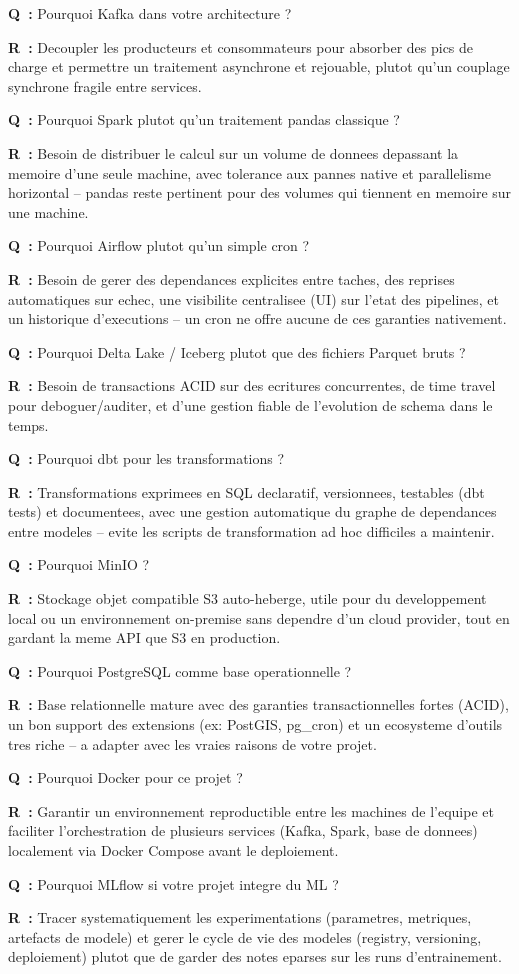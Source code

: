 \documentclass[11pt,a4paper]{article}
\newcommand{\qr}[2]{%
  \par\noindent\textbf{Q~:} #1\par
  \noindent\textbf{R~:} #2\par\smallskip
}
\begin{document}
\qr{Pourquoi Kafka dans votre architecture ?}{Decoupler les producteurs et consommateurs pour absorber des pics de charge et permettre un traitement asynchrone et rejouable, plutot qu'un couplage synchrone fragile entre services.}

\qr{Pourquoi Spark plutot qu'un traitement pandas classique ?}{Besoin de distribuer le calcul sur un volume de donnees depassant la memoire d'une seule machine, avec tolerance aux pannes native et parallelisme horizontal -- pandas reste pertinent pour des volumes qui tiennent en memoire sur une machine.}

\qr{Pourquoi Airflow plutot qu'un simple cron ?}{Besoin de gerer des dependances explicites entre taches, des reprises automatiques sur echec, une visibilite centralisee (UI) sur l'etat des pipelines, et un historique d'executions -- un cron ne offre aucune de ces garanties nativement.}

\qr{Pourquoi Delta Lake / Iceberg plutot que des fichiers Parquet bruts ?}{Besoin de transactions ACID sur des ecritures concurrentes, de time travel pour deboguer/auditer, et d'une gestion fiable de l'evolution de schema dans le temps.}

\qr{Pourquoi dbt pour les transformations ?}{Transformations exprimees en SQL declaratif, versionnees, testables (dbt tests) et documentees, avec une gestion automatique du graphe de dependances entre modeles -- evite les scripts de transformation ad hoc difficiles a maintenir.}

\qr{Pourquoi MinIO ?}{Stockage objet compatible S3 auto-heberge, utile pour du developpement local ou un environnement on-premise sans dependre d'un cloud provider, tout en gardant la meme API que S3 en production.}

\qr{Pourquoi PostgreSQL comme base operationnelle ?}{Base relationnelle mature avec des garanties transactionnelles fortes (ACID), un bon support des extensions (ex: PostGIS, pg\_cron) et un ecosysteme d'outils tres riche -- a adapter avec les vraies raisons de votre projet.}

\qr{Pourquoi Docker pour ce projet ?}{Garantir un environnement reproductible entre les machines de l'equipe et faciliter l'orchestration de plusieurs services (Kafka, Spark, base de donnees) localement via Docker Compose avant le deploiement.}

\qr{Pourquoi MLflow si votre projet integre du ML ?}{Tracer systematiquement les experimentations (parametres, metriques, artefacts de modele) et gerer le cycle de vie des modeles (registry, versioning, deploiement) plutot que de garder des notes eparses sur les runs d'entrainement.}
\end{document}
